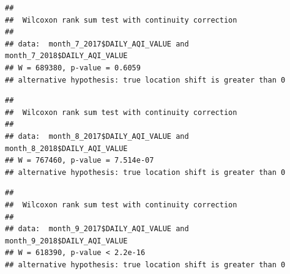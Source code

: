 \documentclass[12pt,]{article}
\newenvironment{Shaded}{\begin{snugshade}}{\end{snugshade}}
\newcommand{\KeywordTok}[1]{\textcolor[rgb]{0.13,0.29,0.53}{\textbf{#1}}}
\newcommand{\DataTypeTok}[1]{\textcolor[rgb]{0.13,0.29,0.53}{#1}}
\newcommand{\DecValTok}[1]{\textcolor[rgb]{0.00,0.00,0.81}{#1}}
\newcommand{\StringTok}[1]{\textcolor[rgb]{0.31,0.60,0.02}{#1}}
\newcommand{\OperatorTok}[1]{\textcolor[rgb]{0.81,0.36,0.00}{\textbf{#1}}}
\newcommand{\NormalTok}[1]{#1}
\begin{document}
\begin{Shaded}
\end{Shaded}

\begin{verbatim}
## 
##  Wilcoxon rank sum test with continuity correction
## 
## data:  month_7_2017$DAILY_AQI_VALUE and month_7_2018$DAILY_AQI_VALUE
## W = 689380, p-value = 0.6059
## alternative hypothesis: true location shift is greater than 0
\end{verbatim}

\begin{Shaded}
\end{Shaded}

\begin{verbatim}
## 
##  Wilcoxon rank sum test with continuity correction
## 
## data:  month_8_2017$DAILY_AQI_VALUE and month_8_2018$DAILY_AQI_VALUE
## W = 767460, p-value = 7.514e-07
## alternative hypothesis: true location shift is greater than 0
\end{verbatim}

\begin{Shaded}
\end{Shaded}

\begin{verbatim}
## 
##  Wilcoxon rank sum test with continuity correction
## 
## data:  month_9_2017$DAILY_AQI_VALUE and month_9_2018$DAILY_AQI_VALUE
## W = 618390, p-value < 2.2e-16
## alternative hypothesis: true location shift is greater than 0
\end{verbatim}
\end{document}
